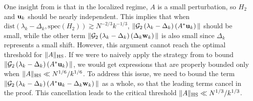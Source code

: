 \documentclass[10pt,reqno]{amsart}
\numberwithin{equation}{section}
\numberwithin{figure}{section}
\theoremstyle{plain} %
\theoremstyle{definition} %
\renewcommand{\txt}[1]{\text{\rm{#1}}}
\newcommand{\cG}{{\mathcal G}}
\newcommand{\pa}[1]{\left({#1}\right)}
\newcommand{\norm}[1]{\lVert #1 \rVert}
\newcommand{\dist}{\mathrm{dist}}
\newcommand{\spec}{\mathrm{spec}}
\newcommand{\bu}{{\bf{u}}}
\newcommand{\bw}{{\bf{w}}}
\newcommand{\oo}{\mathrm{o}}
\newcommand{\HS}{\txt{HS}}
\numberwithin{equation}{section}
\begin{document}


One insight from \cite{stone2024randommatrixmodelquantum} is that in the localized regime, $A$ is a small perturbation, so $H_2$ and $\bu_k$ should be nearly independent. This implies that when $\dist(\lambda_k-\Delta_k,\spec(H_2)) \gtrsim N^{-2/3}k^{-1/3}$, $\|\cG_2\pa{\lambda_k- \Delta_k}\pa{A^*\bu_k}\|$ should be small, while the other term $\|\cG_2\pa{\lambda_k- \Delta_k}\pa{ \Delta_k\bw_k}\|$ is also small since $\Delta_k$ represents a small shift. However, this argument cannot reach the optimal threshold for $\|A\|_{\HS}$. 
If we were to naively apply the strategy from \cite{stone2024randommatrixmodelquantum} to bound $\|\cG_2\pa{\lambda_k- \Delta_k}\pa{A^*\bu_k}\|$, we would get expressions that are properly bounded only when $\|A\|_{\HS}\ll N^{1/6}/k^{1/6}$. 
To address this issue, we need to bound the term $\|\cG_2\pa{\lambda_k- \Delta_k}\pa{A^*\bu_k - \Delta_k\bw_k}\|$ as a whole, so that the leading terms cancel in the proof. This cancellation leads to the critical threshold $\|A\|_{\HS}\ll N^{1/3}/k^{1/3}$.
\end{document}
